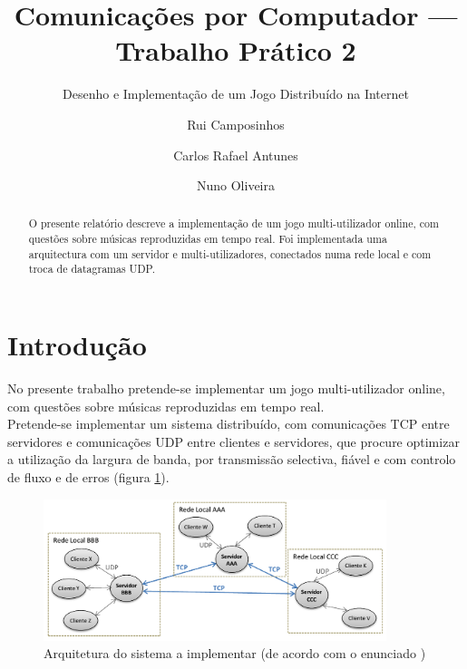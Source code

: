 \documentclass{llncs}
\begin{document}
\mainmatter
\title{Comunicações por Computador --- Trabalho Prático 2}
\subtitle{Desenho e Implementação de um Jogo Distribuído na Internet}
\author{Rui Camposinhos \and Carlos Rafael Antunes \and Nuno Oliveira}
\date{}
\maketitle

\begin{abstract}
O presente relatório descreve a implementação de um jogo multi-utilizador online, com 
questões sobre músicas reproduzidas em tempo real. Foi implementada uma arquitectura 
com um servidor e multi-utilizadores, conectados numa rede local e com troca de datagramas UDP.
\end{abstract}

\section{Introdução}
No presente trabalho pretende-se implementar um jogo multi-utilizador online, com 
questões sobre músicas reproduzidas em tempo real.\\

Pretende-se implementar um sistema distribuído, com comunicações TCP entre servidores e 
comunicações UDP entre clientes e servidores, que procure optimizar a utilização da 
largura de banda, por transmissão selectiva, fiável e com controlo de fluxo e de erros 
(figura \ref{fig:arq}).

\begin{figure}
\begin{center}
\includegraphics[width=10cm]{arq.png} 
\end{center}
\caption{Arquitetura do sistema a implementar (de acordo com o enunciado \cite{enun})}
\label{fig:arq}
\end{figure} 
\end{document}
